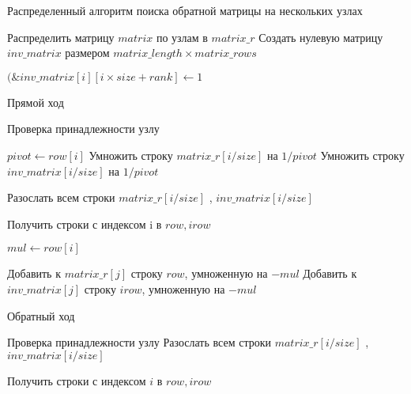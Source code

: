 \begin{small}
    \begin{algorithm}[H]
        \caption{Распределенный алгоритм поиска обратной матрицы на нескольких узлах}
        \label{alg:inv_pl_matrix}
        \begin{algorithmic}[1]

                \State Распределить матрицу $matrix$ по узлам в $matrix\_r$
                \State Создать нулевую матрицу $inv\_matrix$ размером $matrix\_length \times matrix\_rows$

                    \State $(\&inv\_matrix[i][i \times size + rank] \gets 1$
                \EndFor


                    \Comment Прямой ход

                        \Comment Проверка принадлежности узлу

                        \State $pivot \gets row[i]$
                        \State Умножить строку $matrix\_r[i / size]$ на $1/pivot$
                        \State Умножить строку $inv\_matrix[i / size]$ на $1/pivot$

                        \State Разослать всем строки $matrix\_r[i / size]$ , $inv\_matrix[i / size]$
                    \EndIf

                    \State Получить строки с индексом i в $row, irow$

                        \State $mul \gets row[i]$

                        \State Добавить к $matrix\_r[j]$ строку $row$, умноженную на $-mul$
                        \State Добавить к $inv\_matrix[j]$ строку $irow$, умноженную на $-mul$
                    \EndFor
                \EndFor

                    \Comment Обратный ход

                        \Comment Проверка принадлежности узлу
                        \State Разослать всем строки $matrix\_r[i / size]$ , $inv\_matrix[i / size]$
                    \EndIf

                    \State Получить строки с индексом $i$ в $row, irow$



\end{algorithmic}
\end{algorithm}
\end{small}
